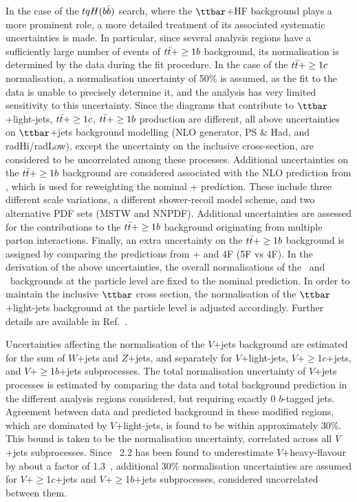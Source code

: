 In the case of the $tqH(b\bar{b})$ search, where the $\ttbar$+HF background plays a more prominent role, a more 
detailed treatment of its associated systematic uncertainties is made. In particular, since several analysis 
regions have a sufficiently large number of events of $t\bar{t}+\geq1b$ background, its normalisation is 
determined by the data during the fit procedure.
In the case of the $t\bar{t}+\geq1c$ normalisation, a normalisation uncertainty of 50\% is assumed, as the fit to the data is unable 
to precisely determine it, and the analysis has very limited sensitivity to this uncertainty.
Since the diagrams that contribute to $\ttbar$+light-jets, $t\bar{t}+\geq1c$, $t\bar{t}+\geq1b$
production are different, all above uncertainties on $\ttbar$+jets
background modelling (NLO generator, PS \& Had, and radHi/radLow), except the uncertainty on the inclusive cross-section, are
considered to be uncorrelated among these processes.
Additional uncertainties on the $t\bar{t}+\geq1b$ background are considered associated with the NLO prediction from {\ShOL}, 
which is used for reweighting the nominal {\powheg}+{\pythiaeight} prediction. 
These include three different scale variations,  a different shower-recoil model scheme, and 
two alternative PDF sets (MSTW and NNPDF). Additional uncertainties are assessed for
the contributions to the $t\bar{t}+\geq1b$ background originating from multiple parton interactions.
Finally, an extra uncertainty on the $t\bar{t}+\geq1b$ background is assigned by comparing 
the predictions from {\powheg}+{\pythiaeight} and {\ShOL} 4F (5F vs 4F).
In the derivation of the above uncertainties, the overall normalisations of the \ttcin\ and \ttbin\ backgrounds 
at the particle level are fixed to the nominal prediction. In order to maintain the inclusive $\ttbar$ cross section, 
the normalisation of the $\ttbar$+light-jets background at the particle level is adjusted accordingly.
Further details are available in Ref.~\cite{Aaboud:2017rss}.

Uncertainties affecting the normalisation of the $V$+jets background are estimated for the sum
of $W$+jets and $Z$+jets, and separately for $V$+light-jets, $V$+$\geq$1$c$+jets, and $V$+$\geq$1$b$+jets subprocesses.
The total normalisation uncertainty of $V$+jets processes is estimated by comparing the data and total background prediction in 
the different analysis regions considered, but requiring exactly 0 $b$-tagged jets. Agreement between data and predicted background 
in these modified regions, which are dominated by $V$+light-jets, is found to be within approximately 30\%. This bound is taken to 
be the normalisation uncertainty, correlated across all $V$+jets subprocesses. 
Since {\sherpa}~2.2 has been found to underestimate $V$+heavy-flavour by about a factor
of 1.3~\cite{Aaboud:2017xsd}, additional 30\% normalisation uncertainties are assumed for $V$+$\geq$1$c$+jets and $V$+$\geq$1$b$+jets
subprocesses, considered uncorrelated between them.

